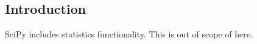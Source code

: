 
\subsection{Introduction}

SciPy includes statistics functionality. This is out of scope of here.

